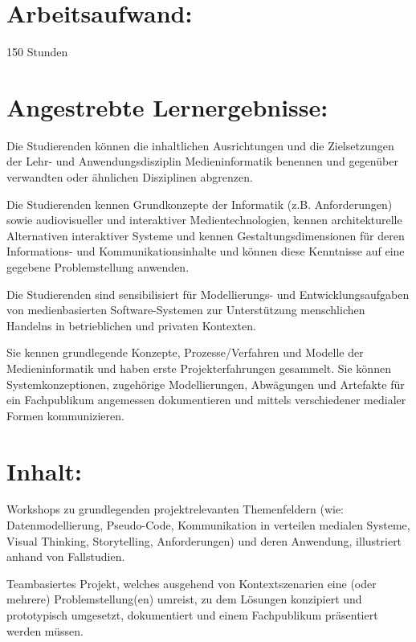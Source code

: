 \section*{Arbeitsaufwand:}\label{arbeitsaufwand-9}

150 Stunden

\section*{Angestrebte
Lernergebnisse:}\label{angestrebte-lernergebnisse-9}

Die Studierenden können die inhaltlichen Ausrichtungen und die
Zielsetzungen der Lehr- und Anwendungsdisziplin Medieninformatik
benennen und gegenüber verwandten oder ähnlichen Disziplinen abgrenzen.

Die Studierenden kennen Grundkonzepte der Informatik (z.B.
Anforderungen) sowie audiovisueller und interaktiver Medientechnologien,
kennen architekturelle Alternativen interaktiver Systeme und kennen
Gestaltungsdimensionen für deren Informations- und Kommunikationsinhalte
und können diese Kenntnisse auf eine gegebene Problemstellung anwenden.

Die Studierenden sind sensibilisiert für Modellierungs- und
Entwicklungsaufgaben von medienbasierten Software-Systemen zur
Unterstützung menschlichen Handelns in betrieblichen und privaten
Kontexten.

Sie kennen grundlegende Konzepte, Prozesse/Verfahren und Modelle der
Medieninformatik und haben erste Projekterfahrungen gesammelt. Sie
können Systemkonzeptionen, zugehörige Modellierungen, Abwägungen und
Artefakte für ein Fachpublikum angemessen dokumentieren und mittels
verschiedener medialer Formen kommunizieren.

\section*{Inhalt:}\label{inhalt-9}

Workshops zu grundlegenden projektrelevanten Themenfeldern (wie:
Datenmodellierung, Pseudo-Code, Kommunikation in verteilen medialen
Systeme, Visual Thinking, Storytelling, Anforderungen) und deren
Anwendung, illustriert anhand von Fallstudien.

Teambasiertes Projekt, welches ausgehend von Kontextszenarien eine (oder
mehrere) Problemstellung(en) umreist, zu dem Lösungen konzipiert und
prototypisch umgesetzt, dokumentiert und einem Fachpublikum präsentiert
werden müssen.

